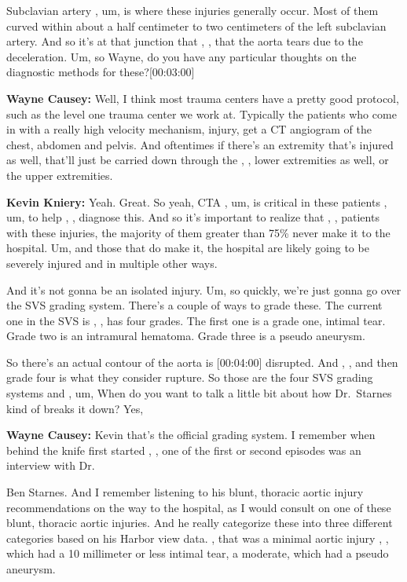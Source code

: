 \documentclass[
]{book}
\begin{document}
Subclavian artery , um, is where these injuries generally occur. Most of
them curved within about a half centimeter to two centimeters of the
left subclavian artery. And so it's at that junction that , , that the
aorta tears due to the deceleration. Um, so Wayne, do you have any
particular thoughts on the diagnostic methods for these?{[}00:03:00{]}

\textbf{Wayne Causey:} Well, I think most trauma centers have a pretty good
protocol, such as the level one trauma center we work at. Typically the
patients who come in with a really high velocity mechanism, injury, get
a CT angiogram of the chest, abdomen and pelvis. And oftentimes if
there's an extremity that's injured as well, that'll just be carried
down through the , , lower extremities as well, or the upper
extremities.

\textbf{Kevin Kniery:} Yeah. Great. So yeah, CTA , um, is critical in these
patients , um, to help , , diagnose this. And so it's important to
realize that , , patients with these injuries, the majority of them
greater than 75\% never make it to the hospital. Um, and those that do
make it, the hospital are likely going to be severely injured and in
multiple other ways.

And it's not gonna be an isolated injury. Um, so quickly, we're just
gonna go over the SVS grading system. There's a couple of ways to grade
these. The current one in the SVS is , , has four grades. The first one
is a grade one, intimal tear. Grade two is an intramural hematoma. Grade
three is a pseudo aneurysm.

So there's an actual contour of the aorta is {[}00:04:00{]} disrupted. And ,
, and then grade four is what they consider rupture. So those are the
four SVS grading systems and , um, When do you want to talk a little bit
about how Dr.~Starnes kind of breaks it down? Yes,

\textbf{Wayne Causey:} Kevin that's the official grading system. I remember
when behind the knife first started , , one of the first or second
episodes was an interview with Dr.

Ben Starnes. And I remember listening to his blunt, thoracic aortic
injury recommendations on the way to the hospital, as I would consult on
one of these blunt, thoracic aortic injuries. And he really categorize
these into three different categories based on his Harbor view data. ,
that was a minimal aortic injury , , which had a 10 millimeter or less
intimal tear, a moderate, which had a pseudo aneurysm.
\end{document}
